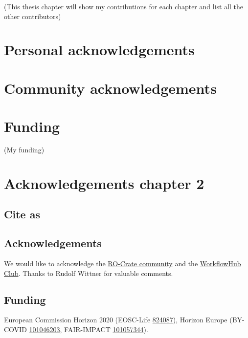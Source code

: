 (This thesis chapter will show my contributions for each chapter and
list all the other contributors)

\hypertarget{personal-acknowledgements}{%
\section{Personal acknowledgements}\label{personal-acknowledgements}}

\hypertarget{community-acknowledgements}{%
\section{Community
acknowledgements}\label{community-acknowledgements}}

\section{Funding}

(My funding)


\section{Acknowledgements chapter 2}

\subsection*{Cite as}


\subsection*{Acknowledgements}

We would like to acknowledge the
\href{https://www.researchobject.org/ro-crate/community.html}{RO-Crate
community} and the
\href{https://about.workflowhub.eu/project/acknowledgements/}{WorkflowHub
Club}. Thanks to Rudolf Wittner for valuable comments.

\hypertarget{funding}{%
\subsection*{Funding}\label{funding}}

European Commission Horizon 2020 (EOSC-Life
\href{https://cordis.europa.eu/project/id/824087}{824087}), Horizon
Europe (BY-COVID
\href{https://cordis.europa.eu/project/id/101046203}{101046203},
FAIR-IMPACT
\href{https://cordis.europa.eu/project/id/101057344}{101057344}).

